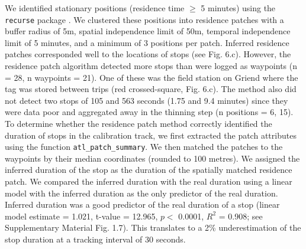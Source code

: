 \documentclass[10pt,paper=a4,headings=standardclasses
]{scrartcl}
\begin{document}
We identified stationary positions (residence time $\geq$ 5 minutes) using the \texttt{recurse} package \citep[n = 837, 46.42 \%; radius = 50m][]{bracis2018}.
We clustered these positions into residence patches with a buffer radius of 5m, spatial independence limit of 50m, temporal independence limit of 5 minutes, and a minimum of 3 positions per patch.
Inferred residence patches corresponded well to the locations of stops (see Fig. 6.c).
However, the residence patch algorithm detected more stops than were logged as waypoints (n = 28, n waypoints = 21).
One of these was the field station on Griend where the tag was stored between trips (red crossed-square, Fig. 6.c).
The method also did not detect two stops of 105 and 563 seconds (1.75 and 9.4 minutes) since they were data poor and aggregated away in the thinning step (n positions = 6, 15).
To determine whether the residence patch method correctly identified the duration of stops in the calibration track, we first extracted the patch attributes using the function \texttt{atl\_patch\_summary}.
We then matched the patches to the waypoints by their median coordinates (rounded to 100 metres).
We assigned the inferred duration of the stop as the duration of the spatially matched residence patch.
We compared the inferred duration with the real duration using a linear model with the inferred duration as the only predictor of the real duration.
Inferred duration was a good predictor of the real duration of a stop (linear model estimate = 1.021, t-value = 12.965, $p <$ 0.0001, $R^2$ = 0.908; see Supplementary Material Fig. 1.7).
This translates to a 2\% underestimation of the stop duration at a tracking interval of 30 seconds.
\end{document}
